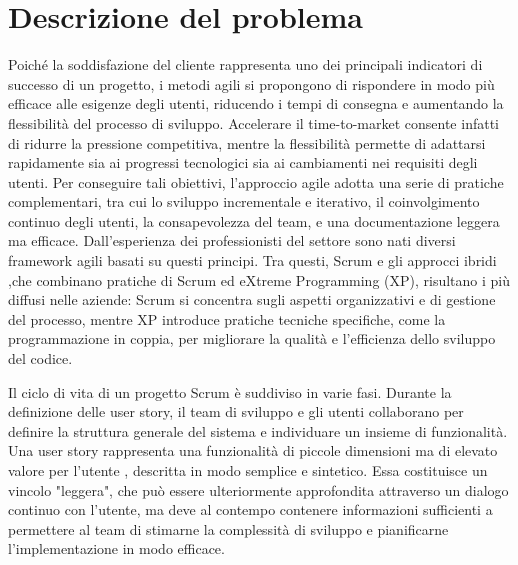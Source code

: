 \documentclass[12pt,a4paper,openright,twoside]{book}
\begin{document}
\chapter{Descrizione del problema}

Poiché la soddisfazione del cliente rappresenta uno dei principali indicatori di successo di un progetto, i metodi agili si propongono di rispondere in modo più efficace alle esigenze degli utenti, riducendo i tempi di consegna e aumentando la flessibilità del processo di sviluppo. Accelerare il time-to-market consente infatti di ridurre la pressione competitiva, mentre la flessibilità permette di adattarsi rapidamente sia ai progressi tecnologici sia ai cambiamenti nei requisiti degli utenti. Per conseguire tali obiettivi, l’approccio agile adotta una serie di pratiche complementari, tra cui lo sviluppo incrementale e iterativo, il coinvolgimento continuo degli utenti, la consapevolezza del team, e una documentazione leggera ma efficace. Dall’esperienza dei professionisti del settore sono nati diversi framework agili basati su questi principi. Tra questi, Scrum e gli approcci ibridi ,che combinano pratiche di Scrum ed eXtreme Programming (XP), risultano i più diffusi nelle aziende: Scrum si concentra sugli aspetti organizzativi e di gestione del processo, mentre XP introduce pratiche tecniche specifiche, come la programmazione in coppia, per migliorare la qualità e l’efficienza dello sviluppo del codice.

\vspace{1em}

Il ciclo di vita di un progetto Scrum è suddiviso in varie fasi. Durante la definizione delle user story, il team di sviluppo e gli utenti collaborano per definire la struttura generale del sistema e individuare un insieme di funzionalità. Una user story rappresenta una funzionalità di piccole dimensioni ma di elevato valore per l’utente \cite{cohn2004user}, descritta in modo semplice e sintetico. Essa costituisce un vincolo "leggera", che può essere ulteriormente approfondita attraverso un dialogo continuo con l’utente, ma deve al contempo contenere informazioni sufficienti a permettere al team di stimarne la complessità di sviluppo e pianificarne l’implementazione in modo efficace.

\vspace{1em}
\end{document}
